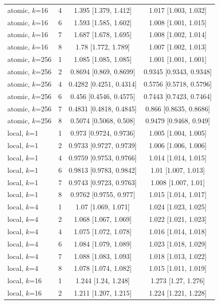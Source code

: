 {\begin{longtable}{llcc}
atomic, $k$=16 & 4 & 1.395 [1.379, 1.412] & 1.017 [1.003, 1.032] \\
atomic, $k$=16 & 6 & 1.593 [1.585, 1.602] & 1.008 [1.001, 1.015] \\
atomic, $k$=16 & 7 & 1.687 [1.678, 1.695] & 1.008 [1.002, 1.014] \\
atomic, $k$=16 & 8 & 1.78 [1.772, 1.789] & 1.007 [1.002, 1.013] \\
\midrule
atomic, $k$=256 & 1 & 1.085 [1.085, 1.085] & 1.001 [1.001, 1.001] \\
atomic, $k$=256 & 2 & 0.8694 [0.869, 0.8699] & 0.9345 [0.9343, 0.9348] \\
atomic, $k$=256 & 4 & 0.4282 [0.4251, 0.4314] & 0.5756 [0.5718, 0.5796] \\
atomic, $k$=256 & 6 & 0.456 [0.4546, 0.4575] & 0.7443 [0.7423, 0.7464] \\
atomic, $k$=256 & 7 & 0.4831 [0.4818, 0.4845] & 0.866 [0.8635, 0.8686] \\
atomic, $k$=256 & 8 & 0.5074 [0.5068, 0.508] & 0.9479 [0.9468, 0.949] \\
\midrule
local, $k$=1 & 1 & 0.973 [0.9724, 0.9736] & 1.005 [1.004, 1.005] \\
local, $k$=1 & 2 & 0.9733 [0.9727, 0.9739] & 1.006 [1.006, 1.006] \\
local, $k$=1 & 4 & 0.9759 [0.9753, 0.9766] & 1.014 [1.014, 1.015] \\
local, $k$=1 & 6 & 0.9813 [0.9783, 0.9842] & 1.01 [1.007, 1.013] \\
local, $k$=1 & 7 & 0.9743 [0.9723, 0.9763] & 1.008 [1.007, 1.01] \\
local, $k$=1 & 8 & 0.9762 [0.9755, 0.977] & 1.015 [1.014, 1.017] \\
\midrule
local, $k$=4 & 1 & 1.07 [1.069, 1.071] & 1.024 [1.023, 1.025] \\
local, $k$=4 & 2 & 1.068 [1.067, 1.069] & 1.022 [1.021, 1.023] \\
local, $k$=4 & 4 & 1.075 [1.072, 1.078] & 1.016 [1.014, 1.018] \\
local, $k$=4 & 6 & 1.084 [1.079, 1.089] & 1.023 [1.018, 1.029] \\
local, $k$=4 & 7 & 1.088 [1.083, 1.093] & 1.018 [1.013, 1.022] \\
local, $k$=4 & 8 & 1.078 [1.074, 1.082] & 1.015 [1.011, 1.019] \\
\midrule
local, $k$=16 & 1 & 1.244 [1.24, 1.248] & 1.273 [1.27, 1.276] \\
local, $k$=16 & 2 & 1.211 [1.207, 1.215] & 1.224 [1.221, 1.228] \\

\end{longtable}}
